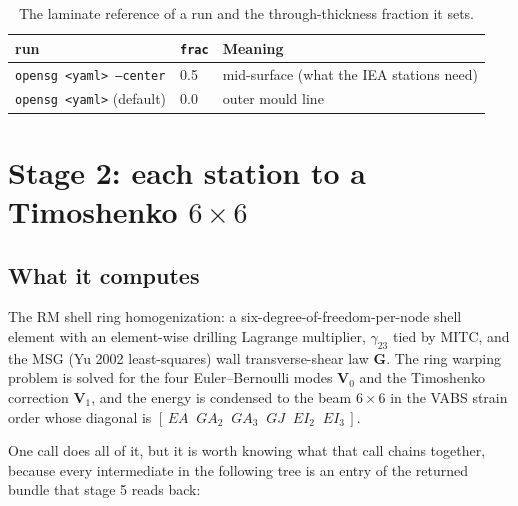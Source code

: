 \begin{table}[htbp]
\centering
\small
\caption{The laminate reference of a run and the through-thickness fraction it sets.}
\label{tab:windio:reference}
\begin{tabular}{lll}
\toprule
run & \texttt{frac} & Meaning \\
\midrule
\texttt{opensg <yaml> --center} & 0.5 & mid-surface (what the IEA stations need) \\
\texttt{opensg <yaml>} (default) & 0.0 & outer mould line \\
\bottomrule
\end{tabular}
\end{table}

\section{Stage 2: each station to a Timoshenko $6\times6$}
\label{sec:windio:stage2}

\subsection*{What it computes}

The RM shell ring homogenization: a six-degree-of-freedom-per-node shell
element with an element-wise drilling Lagrange multiplier, $\gamma_{23}$ tied
by MITC, and the MSG (Yu 2002 least-squares) wall transverse-shear law
$\mathbf{G}$. The ring warping problem is solved for the four Euler--Bernoulli
modes $\mathbf{V}_0$ and the Timoshenko correction $\mathbf{V}_1$, and the
energy is condensed to the beam $6\times6$ in the VABS strain order
whose diagonal is $[\,EA\;\;GA_2\;\;GA_3\;\;GJ\;\;EI_2\;\;EI_3\,]$.

One call does all of it, but it is worth knowing what that call chains together,
because every intermediate in the following tree is an entry of the returned
bundle that stage 5 reads back:

